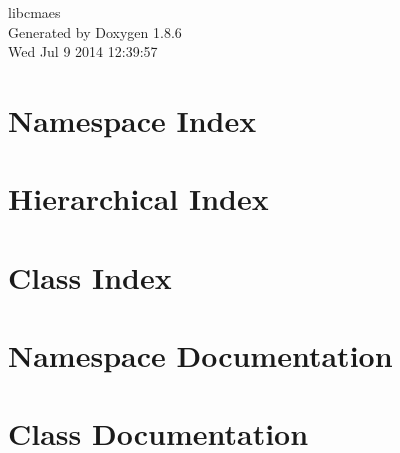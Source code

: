 \documentclass[twoside]{book}
\newcommand{\clearemptydoublepage}{%
  \newpage{\pagestyle{empty}\cleardoublepage}%
}
\begin{document}
\hypersetup{pageanchor=false}
\begin{titlepage}
\vspace*{7cm}
\begin{center}%
{\Large libcmaes }\\
\vspace*{1cm}
{\large Generated by Doxygen 1.8.6}\\
\vspace*{0.5cm}
{\small Wed Jul 9 2014 12:39:57}\\
\end{center}
\end{titlepage}
\clearemptydoublepage
\tableofcontents
\clearemptydoublepage
{}
\hypersetup{pageanchor=true}

\chapter{Namespace Index}

\chapter{Hierarchical Index}

\chapter{Class Index}

\chapter{Namespace Documentation}


\chapter{Class Documentation}

























\newpage
{}
{}
\printindex
\end{document}
